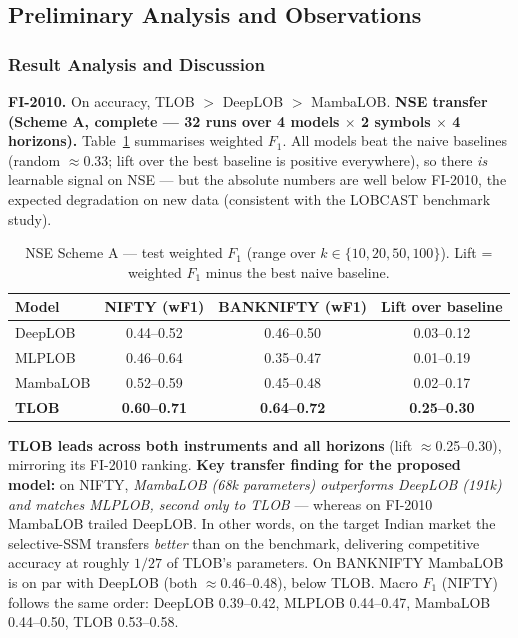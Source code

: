 \documentclass[11pt]{article}
\begin{document}
\subsection{Preliminary Analysis and Observations}
\subsubsection{Result Analysis and Discussion}
\textbf{FI-2010.} On accuracy, TLOB $>$ DeepLOB $>$ MambaLOB. \textbf{NSE transfer (Scheme A, complete ---
32 runs over 4 models $\times$ 2 symbols $\times$ 4 horizons).} Table~\ref{tab:nse} summarises weighted
$F_1$. All models beat the naive baselines (random $\approx$0.33; lift over the best baseline is positive
everywhere), so there \emph{is} learnable signal on NSE --- but the absolute numbers are well below FI-2010,
the expected degradation on new data (consistent with the LOBCAST benchmark study).
\begin{table}[h]
\centering
\caption{NSE Scheme A --- test weighted $F_1$ (range over $k\in\{10,20,50,100\}$). Lift = weighted $F_1$
minus the best naive baseline.}
\label{tab:nse}
\begin{tabular}{@{}lccc@{}}
\toprule
Model & NIFTY (wF1) & BANKNIFTY (wF1) & Lift over baseline \\
\midrule
DeepLOB  & 0.44--0.52 & 0.46--0.50 & 0.03--0.12 \\
MLPLOB   & 0.46--0.64 & 0.35--0.47 & 0.01--0.19 \\
MambaLOB & 0.52--0.59 & 0.45--0.48 & 0.02--0.17 \\
\textbf{TLOB} & \textbf{0.60--0.71} & \textbf{0.64--0.72} & \textbf{0.25--0.30} \\
\bottomrule
\end{tabular}
\end{table}

\textbf{TLOB leads across both instruments and all horizons} (lift $\approx$0.25--0.30), mirroring its
FI-2010 ranking. \textbf{Key transfer finding for the proposed model:} on NIFTY, \emph{MambaLOB (68k
parameters) outperforms DeepLOB (191k) and matches MLPLOB, second only to TLOB} --- whereas on FI-2010
MambaLOB trailed DeepLOB. In other words, on the target Indian market the selective-SSM transfers
\emph{better} than on the benchmark, delivering competitive accuracy at roughly $1/27$ of TLOB's
parameters. On BANKNIFTY MambaLOB is on par with DeepLOB (both $\approx$0.46--0.48), below TLOB. Macro $F_1$
(NIFTY) follows the same order: DeepLOB 0.39--0.42, MLPLOB 0.44--0.47, MambaLOB 0.44--0.50, TLOB 0.53--0.58.
\end{document}
